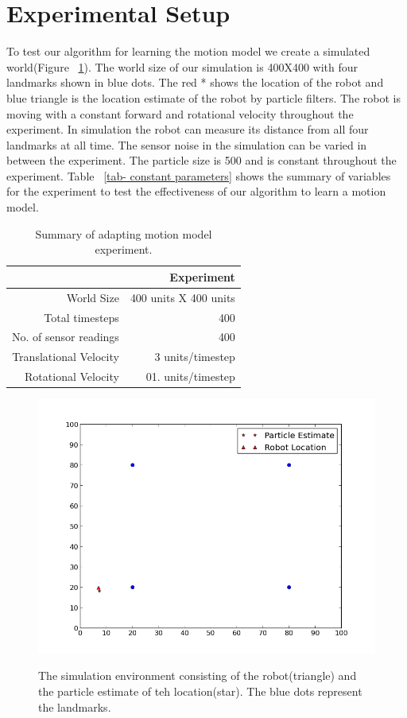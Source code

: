 \documentclass[12pt,draft]{dalcsthesis}
\begin{document}
\section{Experimental Setup}
To test our algorithm for learning the motion model we create a simulated world(Figure ~\ref{fig-: simulation world}). The world size of our simulation is 400X400 with four landmarks shown in blue dots. The red * shows the location of the robot and blue triangle is the location estimate of the  robot by particle filters. The robot is moving with a constant forward and rotational velocity throughout the experiment. In simulation the robot can measure its distance from all four landmarks at all time. The sensor noise in the simulation can be varied in between the experiment. The particle size is 500 and is constant throughout the experiment. Table ~\ref{tab- constant parameters} shows the summary of variables for the experiment to test the effectiveness of our algorithm to learn a motion model.
\begin{table}[tbh]
\centering
\begin{tabular}{|r|r|}
    \hline
    & Experiment \\
    \hline \hline
    World Size & 400 units X 400 units\\
    \hline
    Total timesteps & 400  \\
    \hline
    No. of sensor readings & 400 \\
    \hline
    Translational Velocity & 3 units/timestep \\
    \hline
    Rotational Velocity & 01. units/timestep \\
    \hline
\end{tabular}
 \caption{\label{tab-constant paramters}Summary of adapting motion model experiment.}
\end{table}

\begin{figure}
  \centering
     {\includegraphics[height = 3.0 in]{0.png}}
  \caption{\label{fig-: simulation world}The simulation environment consisting of the robot(triangle) and the particle estimate of teh location(star). The blue dots represent the landmarks.}
\end{figure}
\end{document}

